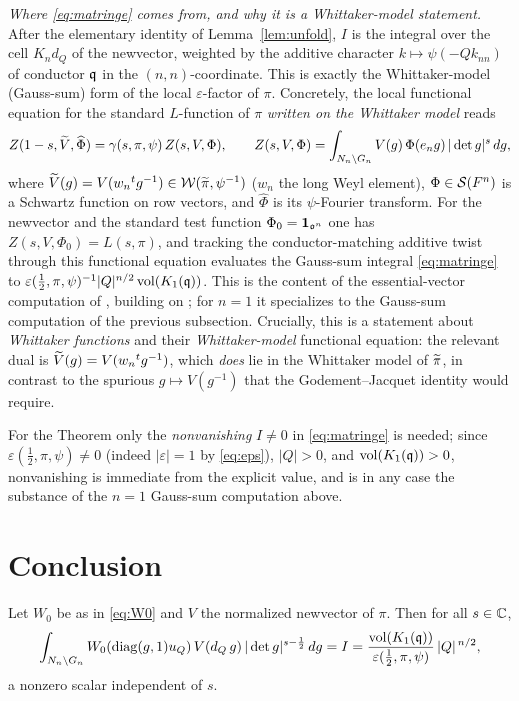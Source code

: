 \noindent\emph{Where \eqref{eq:matringe} comes from, and why it is a Whittaker-model statement.}
After the elementary identity of Lemma~\ref{lem:unfold}, $I$ is the integral over the cell
$K_n d_Q$ of the newvector, weighted by the additive character $k\mapsto\psi(-Q k_{nn})$ of
conductor $\mathfrak{q}$ in the $(n,n)$-coordinate. This is exactly the Whittaker-model
\textup{(}Gauss-sum\textup{)} form of the local $\varepsilon$-factor of $\pi$. Concretely, the
local functional equation for the standard $L$-function of $\pi$ \emph{written on the Whittaker
model} reads
\[
Z(1-s,\widetilde{V},\widehat\Phi)=\gamma(s,\pi,\psi)\,Z(s,V,\Phi),\qquad
Z(s,V,\Phi)=\int_{N_n\backslash G_n}V(g)\,\Phi(e_n g)\,|\det g|^{s}\,dg,
\]
where $\widetilde{V}(g)=V(w_n{}^{t}g^{-1})\in\mathcal{W}(\widetilde{\pi},\psi^{-1})$ \textup{(}$w_n$ the
long Weyl element\textup{)}, $\Phi\in\mathcal S(F^{n})$ is a Schwartz function on row vectors,
and $\widehat\Phi$ is its $\psi$-Fourier transform. For the newvector and the standard test
function $\Phi_0=\mathbf 1_{\mathfrak{o}^{n}}$ one has $Z(s,V,\Phi_0)=L(s,\pi)$, and tracking the
conductor-matching additive twist through this functional equation evaluates the Gauss-sum
integral \eqref{eq:matringe} to $\varepsilon(\tfrac12,\pi,\psi)^{-1}|Q|^{n/2}\operatorname{vol}(K_1(\mathfrak{q}))$.
This is the content of the essential-vector computation of \cite[Thm.~1.1, \S3]{Matringe},
building on \cite[\S\S4--5]{JPSS81}; for $n=1$ it specializes to the Gauss-sum computation of the
previous subsection. Crucially, this is a statement about \emph{Whittaker functions} and their
\emph{Whittaker-model} functional equation: the relevant dual is
$\widetilde{V}(g)=V(w_n{}^{t}g^{-1})$, which \emph{does} lie in the Whittaker model of
$\widetilde{\pi}$, in contrast to the spurious $g\mapsto V(g^{-1})$ that the Godement--Jacquet
identity would require.

\medskip
\noindent For the Theorem only the \emph{nonvanishing} $I\neq0$ in \eqref{eq:matringe} is needed;
since $\varepsilon(\tfrac12,\pi,\psi)\neq0$ \textup{(}indeed $|\varepsilon|=1$ by
\eqref{eq:eps}\textup{)}, $|Q|>0$, and $\operatorname{vol}(K_1(\mathfrak{q}))>0$, nonvanishing is immediate from
the explicit value, and is in any case the substance of the $n=1$ Gauss-sum computation above.

\section*{Conclusion}

\begin{qtwoproposition}\label{prop:final}
Let $W_0$ be as in \eqref{eq:W0} and $V$ the normalized newvector of $\pi$. Then for all
$s\in\mathbb{C}$,
\[
\int_{N_n\backslash G_n} W_0(\operatorname{diag}(g,1)u_Q)\,V(d_Q\,g)\,|\det g|^{s-\frac12}\,dg
= I
=\frac{\operatorname{vol}(K_1(\mathfrak{q}))}{\varepsilon(\tfrac12,\pi,\psi)}\,|Q|^{\,n/2},
\]
a nonzero scalar independent of $s$.
\end{qtwoproposition}

